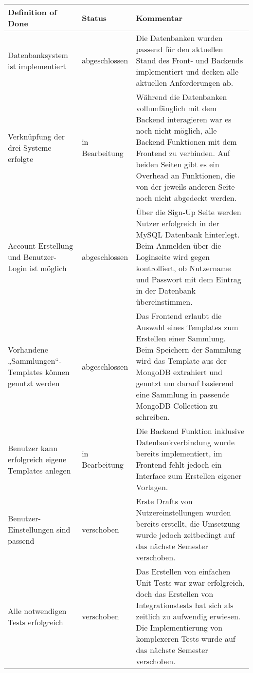 \begin{table}[h!]
    \centering
    \renewcommand{\arraystretch}{1.5}
    \begin{tabular}{|p{}|p{}|p{}|}
        \hline
        \textbf{Definition of Done} & \textbf{Status} & \textbf{Kommentar} \\
        \hline
        Datenbanksystem ist implementiert & abgeschlossen & Die Datenbanken wurden passend für den aktuellen Stand des Front- und Backends implementiert und decken alle aktuellen Anforderungen ab. \\
        \hline
        Verknüpfung der drei Systeme erfolgte & in Bearbeitung & Während die Datenbanken vollumfänglich mit dem Backend interagieren war es noch nicht möglich, alle Backend Funktionen mit dem Frontend zu verbinden.
        Auf beiden Seiten gibt es ein Overhead an Funktionen, die von der jeweils anderen Seite noch nicht abgedeckt werden. \\
        \hline
        Account-Erstellung und Benutzer-Login ist möglich & abgeschlossen &  Über die Sign-Up Seite werden Nutzer erfolgreich in der MySQL Datenbank hinterlegt.
        Beim Anmelden über die Loginseite wird gegen kontrolliert, ob Nutzername und Passwort mit dem Eintrag in der Datenbank übereinstimmen.
        \\
        \hline
        Vorhandene „Sammlungen“-Templates können genutzt werden & abgeschlossen & Das Frontend erlaubt die Auswahl eines Templates zum Erstellen einer Sammlung.
        Beim Speichern der Sammlung wird das Template aus der MongoDB extrahiert und genutzt um darauf basierend eine Sammlung in passende MongoDB Collection zu schreiben.
        \\
        \hline
        Benutzer kann erfolgreich eigene Templates anlegen & in Bearbeitung & Die Backend Funktion inklusive Datenbankverbindung wurde bereits implementiert, im Frontend fehlt jedoch ein Interface zum Erstellen eigener Vorlagen. \\
        \hline
        Benutzer-Einstellungen sind passend & verschoben & Erste Drafts von Nutzereinstellungen wurden bereits erstellt, die Umsetzung wurde jedoch zeitbedingt auf das nächste Semester verschoben. \\
        \hline
        Alle notwendigen Tests erfolgreich & verschoben & Das Erstellen von einfachen Unit-Tests war zwar erfolgreich, doch das Erstellen von Integrationstests hat sich als zeitlich zu aufwendig erwiesen.
        Die Implementierung von komplexeren Tests wurde auf das nächste Semester verschoben. \\
        \hline
    \end{tabular}
    \label{tab:definition-of-done-vergleich_2}
\end{table}
\newpage
